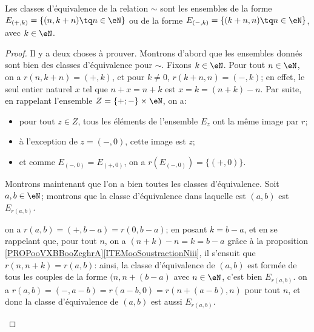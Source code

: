 \begin{proposition}	\label{PROPooClassesEquivalenceRelatifs}
	Les classes d'équivalence de la relation \( \sim \) sont les ensembles de la forme \( E_{(+,k)} = \{ (n, k+n) \tq n \in \eN \} \) ou de la forme \(E_{(-,k)} = \{ (k+n, n) \tq n \in \eN \} \), avec \( k \in \eN \).
\end{proposition}

\begin{proof}
	Il y a deux choses à prouver. Montrons d'abord que les ensembles donnés sont bien des classes d'équivalence pour \( \sim \). Fixons \( k \in \eN \). Pour tout \( n \in \eN \), on a \( r(n, k+n) = (+,k) \), et pour \( k \neq 0 \), \( r(k+n, n) = (-, k) \); en effet, le seul entier naturel \( x \) tel que \( n + x = n+k \) est \( x = k = (n+k) - n\). Par suite, en rappelant l'ensemble \( Z = \{ +; - \} \times \eN \), on a:
 	\begin{itemize}
  		\item
			pour tout \( z \in  Z \), tous les éléments de l'ensemble \( E_z \) ont la même image par \( r \);
   		\item
	 		à l'exception de \( z = (-, 0) \), cette image est \(z \);
		\item
  			et comme \( E_{(-,0)} = E_{(+,0)} \), on a \( r(E_{(-,0)}) = \{(+,0)\} \).
	 \end{itemize}

  	Montrons maintenant que l'on a bien toutes les classes d'équivalence. Soit \( a, b \in \eN \); montrons que la classe d'équivalence dans laquelle est \( (a,b) \) est \( E_{r(a,b)} \).
   	\begin{subproof}
  			on a \( r(a,b) = (+,b-a) = r(0, b-a) \); en posant \( k = b - a \), et en se rappelant que, pour tout \( n \), on a \( (n + k) - n = k = b - a \) grâce à la proposition \ref{PROPooVXBBooZcghrA}\ref{ITEMooSoustractionNiii}, il s'ensuit que \( r(n, n+k) = r(a,b) \): ainsi, la classe d'équivalence de \( (a,b) \) est formée de tous les couples de la forme \( (n, n+(b-a) \) avec \( n \in \eN\), c'est bien \( E_{r(a,b)} \).
	 	\spitem[Si \( a > b \):]
   			on a  \( r(a,b) = (-,a-b) = r(a-b, 0) = r(n+(a-b), n) \) pour tout \( n \), et donc la classe d'équivalence de \( (a,b) \) est aussi \( E_{r(a,b)} \).
	\end{subproof}
\end{proof}

